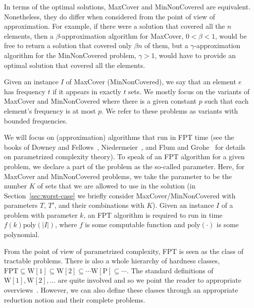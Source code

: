 \documentclass[11pt]{article}
\newcommand{\poly}{{\mathrm{poly}}}
\newcommand{\fpt}{{\mathrm{FPT}}}
\newcommand{\wone}{{\mathrm{W[1]}}}
\newcommand{\wtwo}{{\mathrm{W[2]}}}
\newcommand{\wpclass}{{\mathrm{W[P]}}}
\begin{document}
In terms of the optimal solutions, MaxCover and MinNonCovered are
equivalent. None\-theless, they do differ when considered from the
point of view of approximation. For example, if there were a solution
that covered all the $n$ elements, then a $\beta$-approximation
algorithm for MaxCover, $0 < \beta < 1$, would be free to return a
solution that covered only $\beta n$ of them, but a
$\gamma$-approximation algorithm for the MinNonCovered problem,
$\gamma > 1$, would have to provide an optimal solution that covered
all the elements.

Given an instance $I$ of MaxCover (MinNonCovered), we say that an
element $e$ has frequency $t$ if it appears in exactly $t$ sets.  We
mostly focus on the variants of MaxCover and MinNonCovered where there
is a given constant $p$ such that each element's frequency is at most
$p$. We refer to these problems as variants with bounded frequencies.

We will focus on (approximation) algorithms that run in FPT time (see
the books of Downey and Fellows~\cite{dow-fel:b:parameterized},
Niedermeier~\cite{nie:b:invitation-fpt}, and Flum and
Grohe~\cite{flu-gro:b:parameterized-complexity} for details on
parametrized complexity theory). To speak of an FPT algorithm for a
given problem, we declare a part of the problem as the so-called
parameter. Here, for MaxCover and MinNonCovered problems, we take the
parameter to be the number $K$ of sets that we are allowed to use in
the solution (in Section~\ref{sec:worst-case} we briefly consider
MaxCover/MinNonCovered with parameters $T$, $T'$, and their
combinations with $K$). Given an instance $I$ of a problem with
parameter $k$, an FPT algorithm is required to run in time
$f(k)\poly(|I|)$, where $f$ is some computable function and $\poly(\cdot)$ is
some polynomial.

From the point of view of parametrized complexity, FPT is seen as the
class of tractable problems. There is also a whole hierarchy of
hardness classes, $\fpt \subseteq \wone \subseteq \wtwo \subseteq
\cdots \wpclass \subseteq \cdots$. The standard definitions of $\wone,
\wtwo, \ldots$ are quite involved and so we point the reader to
appropriate
overviews~\cite{dow-fel:b:parameterized,nie:b:invitation-fpt,flu-gro:b:parameterized-complexity}.
However, we can also define these classes through an appropriate
reduction notion and their complete problems.
\end{document}
